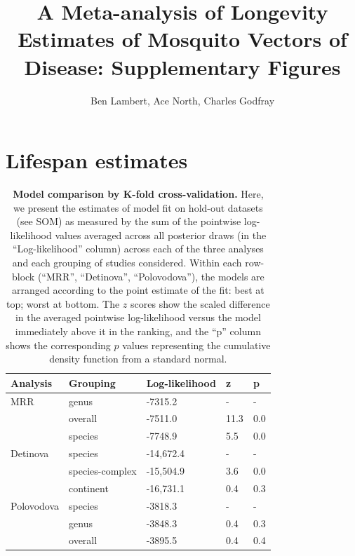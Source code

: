 \documentclass[12pt]{article}
\title{A Meta-analysis of Longevity Estimates of Mosquito Vectors of Disease: Supplementary Figures}
\author{Ben Lambert, Ace North, Charles Godfray}
\begin{document}
\maketitle

\section{Lifespan estimates}

\begin{table}[htbp]
	\begin{tabular}{l|l|l|l|l}
		\textbf{Analysis} & \textbf{Grouping} & \textbf{Log-likelihood} & \textbf{z} & \textbf{p}\\
		\hline
		MRR & genus & -7315.2 & - & -\\
		& overall & -7511.0 & 11.3 & 0.0\\
		& species & -7748.9 & 5.5 & 0.0\\
		\hline
		Detinova & species & -14,672.4 & - & -\\
		& species-complex & -15,504.9 & 3.6 & 0.0\\
		& continent & -16,731.1 & 0.4 & 0.3\\
		\hline
		Polovodova & species & -3818.3 & - & -\\
		& genus & -3848.3 & 0.4 & 0.3\\
		& overall & -3895.5 & 0.4 & 0.4\\
	\end{tabular}
		\caption{\textbf{Model comparison by K-fold cross-validation.} Here, we present the estimates of model fit on hold-out datasets (see SOM) as measured by the sum of the pointwise log-likelihood values averaged across all posterior draws (in the ``Log-likelihood'' column) across each of the three analyses and each grouping of studies considered. Within each row-block (``MRR'', ``Detinova'', ``Polovodova''), the models are arranged according to the point estimate of the fit: best at top; worst at bottom. The $z$ scores show the scaled difference in the averaged pointwise log-likelihood \citep{vehtari2015efficient} versus the model immediately above it in the ranking, and the ``p'' column shows the corresponding $p$ values representing the cumulative density function from a standard normal.}
\end{table}
\end{document}
